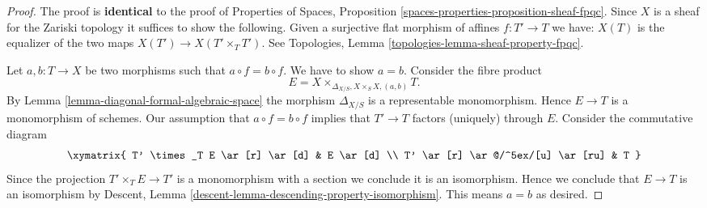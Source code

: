\begin{proof}
The proof is {\bf identical} to the proof of
Properties of Spaces, Proposition
\ref{spaces-properties-proposition-sheaf-fpqc}.
Since $X$ is a sheaf for the Zariski topology it
suffices to show the following. Given a surjective
flat morphism of affines $f : T' \to T$ we have:
$X(T)$ is the equalizer of the two maps $X(T') \to X(T' \times_T T')$.
See Topologies, Lemma \ref{topologies-lemma-sheaf-property-fpqc}.

\medskip\noindent
Let $a, b : T \to X$ be two morphisms such that $a \circ f = b \circ f$.
We have to show $a = b$. Consider the fibre product
$$
E = X \times_{\Delta_{X/S}, X \times_S X, (a, b)} T.
$$
By Lemma \ref{lemma-diagonal-formal-algebraic-space}
the morphism $\Delta_{X/S}$ is a representable monomorphism. Hence
$E \to T$ is a monomorphism of schemes. Our assumption that
$a \circ f = b \circ f$ implies that $T' \to T$ factors (uniquely) through $E$.
Consider the commutative diagram
$$
\xymatrix{
T' \times_T E \ar[r] \ar[d] & E \ar[d] \\
T' \ar[r] \ar@/^5ex/[u] \ar[ru] & T
}
$$
Since the projection $T' \times_T E \to T'$ is a monomorphism
with a section we conclude it is an isomorphism. Hence we conclude that
$E \to T$ is an isomorphism by
Descent, Lemma \ref{descent-lemma-descending-property-isomorphism}.
This means $a = b$ as desired.


\end{proof}
